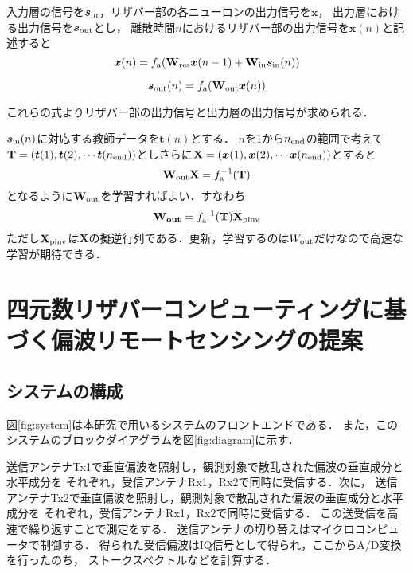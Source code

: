 \documentclass[uplatex,a4paper,10pt]{jsarticle}
\begin{document}
入力層の信号を$\bm{s}_{\rm{in}}$，リザバー部の各ニューロンの出力信号を$\bm{x}$，
出力層における出力信号を$\bm{s}_{\rm{out}}$とし，
離散時間$n$におけるリザバー部の出力信号を$\bm{x}(n)$と記述すると
\begin{equation}
    \bm{x}(n) = f_{\rm{a}}(\mathbf{W_{\rm{res}}} \bm{x}(n-1) + \mathbf{W}_{\rm{in}} \bm{s}_{\rm{in}}(n))
\end{equation}

\begin{equation}
    \bm{s}_{\rm{out}}(n) = f_{\rm{a}}(\mathbf{W}_{\rm{out}} \bm{x}(n))
\end{equation}

これらの式よりリザバー部の出力信号と出力層の出力信号が求められる．

$\bm{s}_{\rm{in}}(n)$に対応する教師データを$\bm{t}(n)$とする．
$n$を$1$から$n_{\rm{end}}$の範囲で考えて$\mathbf{T}=(\bm{t}(1), \bm{t}(2), \cdots \bm{t}(n_{\rm{end}}))$としさらに$\mathbf{X}=(\bm{x}(1), \bm{x}(2), \cdots \bm{x}(n_{\rm{end}}))$とすると
\begin{equation}
    \mathbf{W}_{\rm{out}} \mathbf{X} = f_{\rm{a}}^{-1}(\mathbf{T})
\end{equation}
となるように$\mathbf{W}_{\rm{out}}$を学習すればよい．すなわち
\begin{equation}
    \mathbf{W_{out}}=f_{\rm{a}}^{-1}(\mathbf{T}) \mathbf{X}_{\rm{pinv}}
\end{equation}
ただし$\mathbf{X}_{\rm{pinv}}$は$\mathbf{X}$の擬逆行列である．更新，学習するのは$W_{\rm{out}}$だけなので高速な学習が期待できる．


\section{四元数リザバーコンピューティングに基づく偏波リモートセンシングの提案}

\subsection{システムの構成}
図\ref{fig:system}は本研究で用いるシステムのフロントエンドである．
また，このシステムのブロックダイアグラムを図\ref{fig:diagram}に示す．

送信アンテナTx1で垂直偏波を照射し，観測対象で散乱された偏波の垂直成分と水平成分を
それぞれ，受信アンテナRx1，Rx2で同時に受信する．次に，
送信アンテナTx2で垂直偏波を照射し，観測対象で散乱された偏波の垂直成分と水平成分を
それぞれ，受信アンテナRx1，Rx2で同時に受信する．
この送受信を高速で繰り返すことで測定をする．
送信アンテナの切り替えはマイクロコンピュータで制御する．
得られた受信偏波はIQ信号として得られ，ここからA/D変換を行ったのち，
ストークスベクトルなどを計算する．
\end{document}
